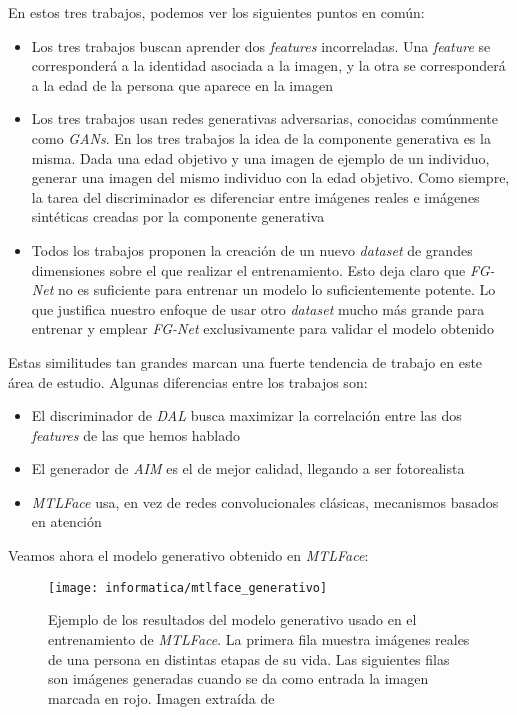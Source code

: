 En estos tres trabajos, podemos ver los siguientes puntos en común:

\begin{itemize}
    \item Los tres trabajos buscan aprender dos \textit{features} incorreladas. Una \textit{feature} se corresponderá a la identidad asociada a la imagen, y la otra se corresponderá a la edad de la persona que aparece en la imagen
    \item Los tres trabajos usan redes generativas adversarias, conocidas comúnmente como \textit{GANs}. En los tres trabajos la idea de la componente generativa es la misma. Dada una edad objetivo y una imagen de ejemplo de un individuo, generar una imagen del mismo individuo con la edad objetivo. Como siempre, la tarea del discriminador es diferenciar entre imágenes reales e imágenes sintéticas creadas por la componente generativa
    \item Todos los trabajos proponen la creación de un nuevo \textit{dataset} de grandes dimensiones sobre el que realizar el entrenamiento. Esto deja claro que \textit{FG-Net} no es suficiente para entrenar un modelo lo suficientemente potente. Lo que justifica nuestro enfoque de usar otro \textit{dataset} mucho más grande para entrenar y emplear \textit{FG-Net} exclusivamente para validar el modelo obtenido
\end{itemize}

Estas similitudes tan grandes marcan una fuerte tendencia de trabajo en este área de estudio. Algunas diferencias entre los trabajos son:

\begin{itemize}
    \item El discriminador de \textit{DAL} busca maximizar la correlación entre las dos \textit{features} de las que hemos hablado
    \item El generador de \textit{AIM} es el de mejor calidad, llegando a ser fotorealista
    \item \textit{MTLFace} usa, en vez de redes convolucionales clásicas, mecanismos basados en atención
\end{itemize}

Veamos ahora el modelo generativo obtenido en \textit{MTLFace}:

\begin{figure}[H]
    \centering
    \texttt{[image: informatica/mtlface\_generativo]}
    \caption{Ejemplo de los resultados del modelo generativo usado en el entrenamiento de \textit{MTLFace}. La primera fila muestra imágenes reales de una persona en distintas etapas de su vida. Las siguientes filas son imágenes generadas cuando se da como entrada la imagen marcada en rojo. Imagen extraída de \cite{informatica:best_fgnet_model}}
\end{figure}

